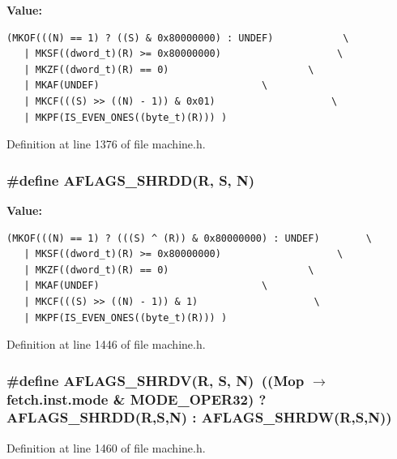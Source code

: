 \textbf{Value:}

\begin{Code}\begin{verbatim}(MKOF(((N) == 1) ? ((S) & 0x80000000) : UNDEF)            \
   | MKSF((dword_t)(R) >= 0x80000000)                    \
   | MKZF((dword_t)(R) == 0)                        \
   | MKAF(UNDEF)                            \
   | MKCF(((S) >> ((N) - 1)) & 0x01)                    \
   | MKPF(IS_EVEN_ONES((byte_t)(R))) )
\end{verbatim}
\end{Code}


Definition at line 1376 of file machine.h.
\subsubsection[{AFLAGS\_\-SHRDD}]{\setlength{\rightskip}{0pt plus 5cm}\#define AFLAGS\_\-SHRDD(R, \/  S, \/  N)}\label{machine_8h_f5adb7512f1d1df3da6bc81082ddbccc}


\textbf{Value:}

\begin{Code}\begin{verbatim}(MKOF(((N) == 1) ? (((S) ^ (R)) & 0x80000000) : UNDEF)        \
   | MKSF((dword_t)(R) >= 0x80000000)                    \
   | MKZF((dword_t)(R) == 0)                        \
   | MKAF(UNDEF)                            \
   | MKCF(((S) >> ((N) - 1)) & 1)                    \
   | MKPF(IS_EVEN_ONES((byte_t)(R))) )
\end{verbatim}
\end{Code}


Definition at line 1446 of file machine.h.
\subsubsection[{AFLAGS\_\-SHRDV}]{\setlength{\rightskip}{0pt plus 5cm}\#define AFLAGS\_\-SHRDV(R, \/  S, \/  N)~((Mop $\rightarrow$ fetch.inst.mode \& MODE\_\-OPER32) ? AFLAGS\_\-SHRDD(R,S,N) : AFLAGS\_\-SHRDW(R,S,N))}\label{machine_8h_f27402faef6c4b973be11cba2e409948}




Definition at line 1460 of file machine.h.
